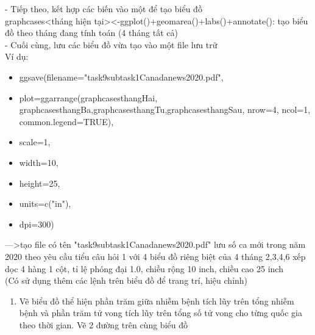 \documentclass[a4paper]{article}
\theoremstyle{definition}
\begin{document}
\begin{enumerate}[i)]
		- Tiếp theo, kết hợp các biến vào một để tạo biểu đồ\\
		graphcases<tháng hiện tại><-ggplot()+geomarea()+labs()+annotate(): tạo biểu đồ theo tháng đang tính toán (4 tháng tất cả)\\
		
		- Cuối cùng, lưu các biểu đồ vừa tạo vào một file lưu trữ\\
		Ví dụ:\\
		\begin{itemize}
	    \item ggsave(filename="task9subtask1Canadanews2020.pdf",\\
		\item plot=ggarrange(graphcasesthangHai, graphcasesthangBa,graphcasesthangTu,graphcasesthangSau, nrow=4, ncol=1, common.legend=TRUE),\\
        \item scale=1,\\
        \item width=10,\\
        \item height=25,\\
        \item units=c("in"),\\
        \item dpi=300)\\
	    \end{itemize}
         --->tạo file có tên "task9subtask1Canadanews2020.pdf" lưu số ca mới trong năm 2020 theo yêu cầu tiểu câu hỏi 1 với 4 biểu đồ riêng biệt của 4 tháng 2,3,4,6 xếp dọc 4 hàng 1 cột, tỉ lệ phóng đại 1.0, chiều rộng 10 inch, chiều cao 25 inch\\
        
        (Có sử dụng thêm các lệnh trên biểu đồ để trang trí, hiệu chỉnh)
        
		

		\begin{enumerate}[1)]
			\item Vẽ biểu đồ thể hiện phần trăm giữa nhiễm bệnh tích lũy trên tổng nhiễm bệnh và phần trăm tử vong tích lũy trên tổng số tử vong cho từng quốc gia theo thời gian. Vẽ 2 đường trên cùng biểu đồ\\
			

\end{enumerate}
\end{enumerate}
\end{document}
